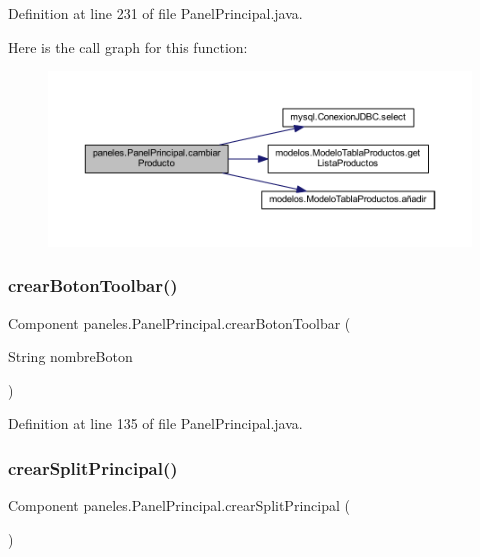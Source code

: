 Definition at line 231 of file Panel\+Principal.\+java.

Here is the call graph for this function\+:\nopagebreak
\begin{figure}[H]
\begin{center}
\leavevmode
\includegraphics[width=350pt]{classpaneles_1_1_panel_principal_aa2151461e479985277d05375c02b1022_cgraph}
\end{center}
\end{figure}
\mbox{\label{classpaneles_1_1_panel_principal_a45d159d89db6217a595c166bf2f0b2ea}} 
\subsubsection{\texorpdfstring{crear\+Boton\+Toolbar()}{crearBotonToolbar()}}
{\footnotesize\ttfamily Component paneles.\+Panel\+Principal.\+crear\+Boton\+Toolbar (\begin{DoxyParamCaption}\item[{String}]{nombre\+Boton }\end{DoxyParamCaption})}



Definition at line 135 of file Panel\+Principal.\+java.

\mbox{\label{classpaneles_1_1_panel_principal_abf6e9ec8437453a751ea1a4bcc33fb87}} 
\subsubsection{\texorpdfstring{crear\+Split\+Principal()}{crearSplitPrincipal()}}
{\footnotesize\ttfamily Component paneles.\+Panel\+Principal.\+crear\+Split\+Principal (\begin{DoxyParamCaption}{ }\end{DoxyParamCaption})}



